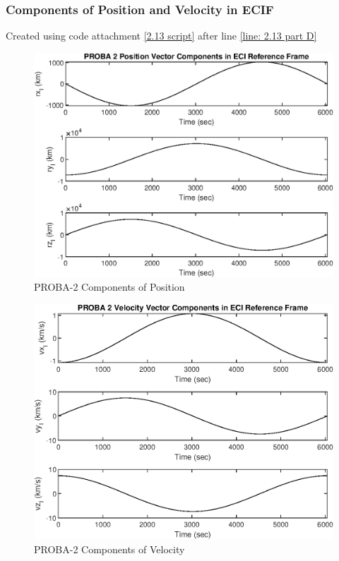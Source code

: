 \documentclass[hidelinks, 12pt]{article}%
\begin{document}
\subsubsection{Components of Position and Velocity in ECIF}
Created using code attachment \ref{2.13 script} after line \ref{line: 2.13 part D}
\begin{figure}[H]
    \begin{centering}
        \includegraphics[width=\textwidth]{output_files/2.13/position_components.eps}
        \caption{PROBA-2 Components of Position}
        \label{position components 2.13}
    \end{centering}
\end{figure}

\begin{figure}[H]
    \begin{centering}
        \includegraphics[width=\textwidth]{output_files/2.13/velocity_components.eps}
        \caption{PROBA-2 Components of Velocity}
        \label{velocity components 2.13}
    \end{centering}
\end{figure}
\end{document}
